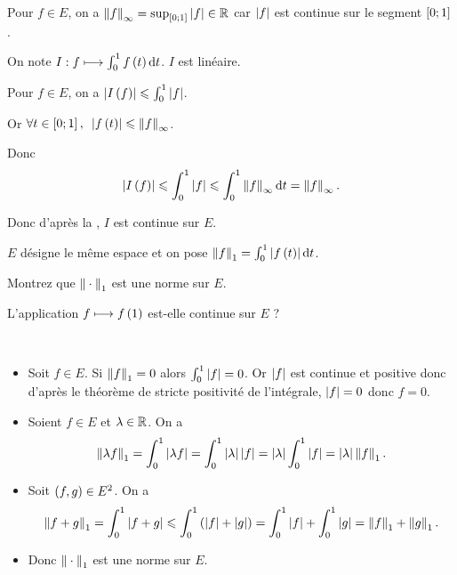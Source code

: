 \begin{corr}
Pour \(f\in E\), on a \(\norme{f}_\infty=\sup_{\intervii{0}{1}}\abs{f}\in\R\) car \(\left\lvert f\right\rvert\) est continue sur le segment \(\left[0;1\right]\).

On note \(I:f\mapsto\int_0^1f\paren{t}\odif{t}\). \(I\) est linéaire.

Pour \(f\in E\), on a \(\left\lvert I\left(f\right)\right\rvert\leqslant\int_0^1\left\lvert f\right\rvert\).

Or \(\quantifs{\forall t\in\intervii{0}{1}}\abs{f\paren{t}}\leq\norme{f}_\infty\).

Donc \[\abs{I\paren{f}}\leq\int_0^1\abs{f}\leq\int_0^1\norme{f}_\infty\odif{t}=\norme{f}_\infty.\]

Donc d'après la , \(I\) est continue sur \(E\).
\end{corr}

\begin{exo}
\(E\) désigne le même espace et on pose \(\norme{f}_1=\int_0^1\abs{f\paren{t}}\odif{t}\).

Montrez que \(\norme{}_1\) est une norme sur \(E\).

L'application \(f\longmapsto f\left(1\right)\) est-elle continue sur \(E\) ?
\end{exo}

\begin{corr}~\\
\begin{itemize}
    \item Soit \(f\in E\). Si \(\norme{f}_1=0\) alors \(\int_0^1\left\lvert f\right\rvert=0\). Or \(\left\lvert f\right\rvert\) est continue et positive donc d'après le théorème de stricte positivité de l'intégrale, \(\left\lvert f\right\rvert=0\) donc \(f=0\). \\
    \item Soient \(f\in E\) et \(\lambda\in\mathbb{R}\). On a \[\norme{\lambda f}_1=\int_0^1\abs{\lambda f}=\int_0^1\abs{\lambda}\abs{f}=\abs{\lambda}\int_0^1\abs{f}=\abs{\lambda}\norme{f}_1.\]
    \item Soit \(\left(f,g\right)\in E^2\). On a \[\norme{f+g}_1=\int_0^1\abs{f+g}\leq\int_0^1\paren{\abs{f}+\abs{g}}=\int_0^1\abs{f}+\int_0^1\abs{g}=\norme{f}_1+\norme{g}_1.\]
    \item Donc \(\norme{}_1\) est une norme sur \(E\).
\end{itemize}
\end{corr}

